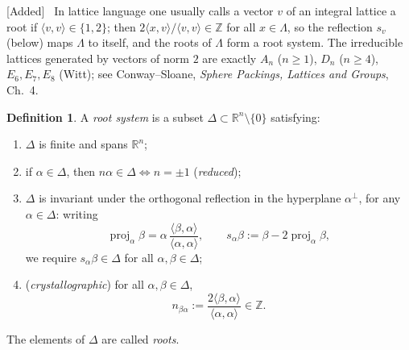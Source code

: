 \documentclass[11pt,openany]{book}
\theoremstyle{plain}
\theoremstyle{definition}
\newtheorem{definition}[theorem]{Definition}
\theoremstyle{remark}
\newcommand{\added}[1]{{\color{addcol}#1}}
\newenvironment{addedblock}{\par\color{addcol}\noindent\textsf{\small[Added]}\ }{\par}
\newcommand{\R}{\mathbb{R}}
\newcommand{\Z}{\mathbb{Z}}
\newcommand{\Lat}{\Lambda}             %
\newcommand{\ip}[2]{\langle #1, #2\rangle}
\begin{document}
\begin{addedblock}
In lattice language one usually calls a vector $v$ of an integral lattice a root if
$\ip{v}{v}\in\{1,2\}$; then $2\ip{x}{v}/\ip{v}{v}\in\Z$ for all $x\in\Lat$, so the reflection $s_v$
(below) maps $\Lat$ to itself, and the roots of $\Lat$ form a root system. The irreducible lattices
generated by vectors of norm $2$ are exactly $A_n$ ($n\ge1$), $D_n$ ($n\ge4$), $E_6,E_7,E_8$ (Witt);
see Conway--Sloane, \emph{Sphere Packings, Lattices and Groups}, Ch.~4.
\end{addedblock}

\begin{definition}\label{L04a:def:rootsystem}
A \emph{root system} is a subset $\Delta\subset\R^n\setminus\{0\}$ satisfying:
\begin{enumerate}[label=\arabic*)]
\item $\Delta$ is finite and spans $\R^n$;
\item if $\alpha\in\Delta$, then $n\alpha\in\Delta \iff n=\pm1$ \quad(\emph{reduced});
\item $\Delta$ is invariant under the orthogonal reflection in the hyperplane $\alpha^\perp$, for any
  $\alpha\in\Delta$: writing
  \[
    \operatorname{proj}_\alpha\beta = \alpha\,\frac{\ip{\beta}{\alpha}}{\ip{\alpha}{\alpha}},\qquad
    s_\alpha\beta := \beta - 2\operatorname{proj}_\alpha\beta ,
  \]
  we require $s_\alpha\beta\in\Delta$ for all $\alpha,\beta\in\Delta$;
\item (\emph{crystallographic}) for all $\alpha,\beta\in\Delta$,
  \[
    n_{\beta\alpha} := \frac{2\ip{\beta}{\alpha}}{\ip{\alpha}{\alpha}}\in\Z .
  \]
\end{enumerate}
\added{The elements of $\Delta$ are called \emph{roots}.}
\end{definition}

\begin{center}
\end{center}
\end{document}
